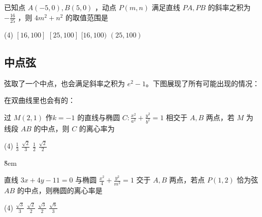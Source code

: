 \vspace{2em}

\begin{problem}
已知点 $A(-5,0), B(5,0)$ ，动点 $P(m, n)$ 满足直线 $P A, P B$ 的斜率之积为 $-\frac{16}{25}$ ，则 $4 m^2+n^2$ 的取值范围是
\begin{tasks}(4)
    \task $[16,100]$
    \task $[25,100]$
    \task $[16,100)$
    \task $(25,100)$
\end{tasks}
\end{problem}

\subsection{中点弦}

\begin{definition}
    弦取了一个中点，也会满足斜率之积为 $e^2-1$。下图展现了所有可能出现的情况：

    \begin{figure} [H]
        \centering
        \resizebox{0.7\textwidth}{!}{}
    \end{figure}
\end{definition}

\begin{definition}
    在双曲线里也会有的：

    \begin{figure} [H]
        \centering
        \resizebox{0.65\textwidth}{!}{}
    \end{figure}

\end{definition}

\begin{example}
    过 $M(2,1)$ 作$k=-1$ 的直线与椭圆 $C: \frac{x^2}{a^2}+\frac{y^2}{b^2}=1$ 相交于 $A, B$ 两点，若 $M$ 为线段 $A B$ 的中点，则 $C$ 的离心率为
    \begin{tasks}(4)
        \task $\frac{1}{3}$
        \task $\frac{\sqrt{2}}{3}$
        \task $\frac{1}{2}$
        \task $\frac{\sqrt{2}}{2}$
    \end{tasks}
\end{example}

\v{8em}

\begin{example}
    直线 $3 x+4 y-11=0$ 与椭圆 $\frac{x^2}{4}+\frac{y^2}{m^2}=1$ 交于 $A, B$ 两点，若点 $P(1,2)$ 恰为弦 $A B$ 的中点，则椭圆的离心率是
    \begin{tasks}(4)
        \task $\frac{\sqrt{3}}{3}$
        \task $\frac{\sqrt{2}}{2}$
        \task $\frac{\sqrt{3}}{2}$
        \task $\frac{\sqrt{6}}{3}$
    \end{tasks}
\end{example}

